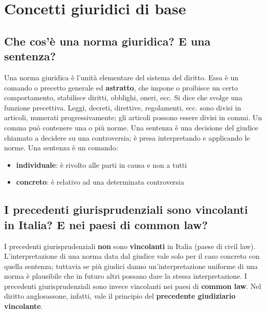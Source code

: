 \newpage
\section{Concetti giuridici di base}

\subsection{Che cos’è una norma giuridica? E una sentenza?}
Una norma giuridica è l'unità elementare del sistema del diritto.
Essa è un comando o precetto generale ed \textbf{astratto}, che impone o proibisce
un certo comportamento, stabilisce diritti, obblighi, oneri, ecc. Si dice che
svolge una funzione precettiva. \newline
Leggi, decreti, direttive, regolamenti, ecc. sono divisi in articoli, numerati
 progressivamente; gli articoli possono essere divisi in commi. \newline
 Un comma può contenere una o più norme. \newline
 \newline
 Una sentenza è una decisione del giudice chiamato a decidere su una controversia;
 è presa interpretando e applicando le norme. \newline
 Una sentenza è un comando:
 \begin{itemize}
     \item \textbf{individuale}: è rivolto alle parti in causa e non a tutti
     \item \textbf{concreto}: è relativo ad una determinata controversia
 \end{itemize}

\subsection{I precedenti giurisprudenziali sono vincolanti in Italia? E nei paesi di common law?}
I precedenti giurisprudenziali \textbf{non} sono \textbf{vincolanti} in Italia (paese di civil law).
L'interpretazione di una norma data dal giudice vale solo per il caso concreto
con quella sentenza; tuttavia se più giudici danno un'interpretazione uniforme
di una norma è plausibile che in futuro altri possano dare la stessa interpretazione.
\newline\newline
I precedenti giurisprudenziali sono invece vincolanti nei paesi di \textbf{common law}.
Nel diritto anglosassone, infatti, vale il principio del \textbf{precedente giudiziario vincolante}.

